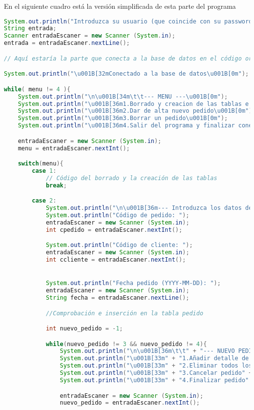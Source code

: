 En el siguiente cuadro está la versión simplificada de esta parte del programa
\begin{lstlisting}[language=Java]
System.out.println("Introduzca su usuario (que coincide con su password): ");
String entrada;
Scanner entradaEscaner = new Scanner (System.in);
entrada = entradaEscaner.nextLine();

// Aquí estaría la parte que conecta a la base de datos en el código original

System.out.println("\u001B[32mConectado a la base de datos\u001B[0m");

while( menu != 4 ){
	System.out.println("\n\u001B[34m\t\t--- MENU ---\u001B[0m");
	System.out.println("\u001B[36m1.Borrado y creacion de las tablas e insercion de tuplas\u001B[0m");
	System.out.println("\u001B[36m2.Dar de alta nuevo pedido\u001B[0m");
	System.out.println("\u001B[36m3.Borrar un pedido\u001B[0m");
	System.out.println("\u001B[36m4.Salir del programa y finalizar conexion\u001B[0m");

	entradaEscaner = new Scanner (System.in);
	menu = entradaEscaner.nextInt();

	switch(menu){
		case 1:
			// Código del borrado y la creación de las tablas
			break;

		case 2:
			System.out.println("\n\u001B[36m--- Introduzca los datos del pedido ---\u001B[0m");
			System.out.println("Código de pedido: ");
			entradaEscaner = new Scanner (System.in);
			int cpedido = entradaEscaner.nextInt();

			System.out.println("Código de cliente: ");
			entradaEscaner = new Scanner (System.in);
			int ccliente = entradaEscaner.nextInt();


			System.out.println("Fecha pedido (YYYY-MM-DD): ");
			entradaEscaner = new Scanner (System.in);
			String fecha = entradaEscaner.nextLine();

			//Comprobación e inserción en la tabla pedido

			int nuevo_pedido = -1;

			while(nuevo_pedido != 3 && nuevo_pedido != 4){
				System.out.println("\n\u001B[36m\t\t" + "--- NUEVO PEDIDO ---" + "\u001B[0m");
				System.out.println("\u001B[33m" + "1.Añadir detalle de producto" + "\u001B[0m");
				System.out.println("\u001B[33m" + "2.Eliminar todos los detalles de producto" + "\u001B[0m");
				System.out.println("\u001B[33m" + "3.Cancelar pedido" + "\u001B[0m");
				System.out.println("\u001B[33m" + "4.Finalizar pedido" + "\u001B[0m");

				entradaEscaner = new Scanner (System.in);
				nuevo_pedido = entradaEscaner.nextInt();


\end{lstlisting}
